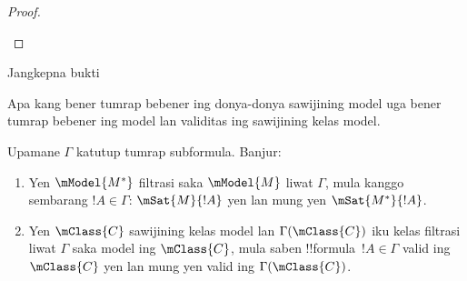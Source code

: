 \documentclass[../../../include/open-logic-section]{subfiles}
\begin{document}
\begin{proof}
\begin{enumerate}
  \end{enumerate}
\end{proof}

\begin{prob}
  Jangkepna bukti 
\end{prob}

Apa kang bener tumrap bebener ing donya-donya sawijining model uga
bener tumrap bebener ing model lan validitas ing sawijining kelas model.

\begin{cor}
  Upamane $\Gamma$ katutup tumrap subformula. Banjur:
  \begin{enumerate}
  \item Yen $\mModel{M^*}$ filtrasi saka $\mModel{M}$ liwat
    $\Gamma$, mula kanggo sembarang $!A \in \Gamma$:
    $\mSat{M}{!A}$ yen lan mung yen $\mSat{M^*}{!A}$.
  \item Yen $\mClass{C}$ sawijining kelas model lan
    $\Gamma(\mClass{C})$ iku kelas filtrasi liwat $\Gamma$ saka model
    ing $\mClass{C}$, mula saben !!{formula}~$!A \in \Gamma$ valid ing
    $\mClass{C}$ yen lan mung yen valid ing
    $\Gamma(\mClass{C})$.
  \end{enumerate}
\end{cor}
\end{document}
